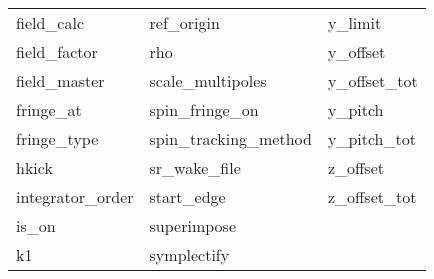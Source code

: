 \begin{tabular}{lll}
field_calc                  & ref_origin                  & y_limit                     \\
field_factor                & rho                         & y_offset                    \\
field_master                & scale_multipoles            & y_offset_tot                \\
fringe_at                   & spin_fringe_on              & y_pitch                     \\
fringe_type                 & spin_tracking_method        & y_pitch_tot                 \\
hkick                       & sr_wake_file                & z_offset                    \\
integrator_order            & start_edge                  & z_offset_tot                \\
is_on                       & superimpose                 &                             \\
k1                          & symplectify                 &                             \\
 \bottomrule
 \end{tabular}
 \vfill
 
